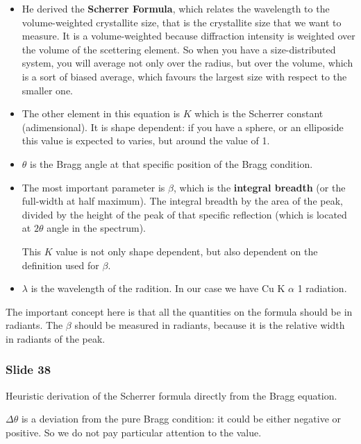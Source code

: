 \documentclass[../main/main.tex]{subfiles}
\begin{document}
\begin{itemize}
\item He derived the \textbf{Scherrer Formula}, which relates the wavelength to the volume-weighted crystallite size, that is the crystallite size that we want to measure.
It is a volume-weighted because diffraction intensity is weighted over the volume of the scettering element.
So when you have a size-distributed system, you will average not only over the radius, but over the volume, which is a sort of biased average, which favours the largest size with respect to the smaller one.

\item The other element in this equation is \( K \) which is the Scherrer constant (adimensional). It is shape dependent: if you have a sphere, or an elliposide this value is expected to varies, but around the value of 1.

\item \( \theta  \) is the Bragg angle at that specific position of the Bragg condition.

\item The most important parameter is \( \beta  \), which is the \textbf{integral breadth} (or the full-width at half maximum). The integral breadth by the area of the peak, divided by the height of the peak of that specific reflection (which is located at \( 2 \theta  \) angle in the spectrum).

This \( K \) value is not only shape dependent, but also  dependent on the definition used for \( \beta  \).

\item
\( \lambda  \) is the wavelength of the radition. In our case we have Cu K \( \alpha  \) 1 radiation.

\end{itemize}

The important concept here is that all the quantities on the formula should be in radiants. The \( \beta  \) should be measured in radiants, because it is the relative width in radiants of the peak.

\subsubsection{Slide 38}
Heuristic derivation of the Scherrer formula directly from the Bragg equation.

\( \Delta \theta  \) is a deviation from the pure Bragg condition: it could be either negative or positive. So we do not pay particular attention to the value.
\end{document}
